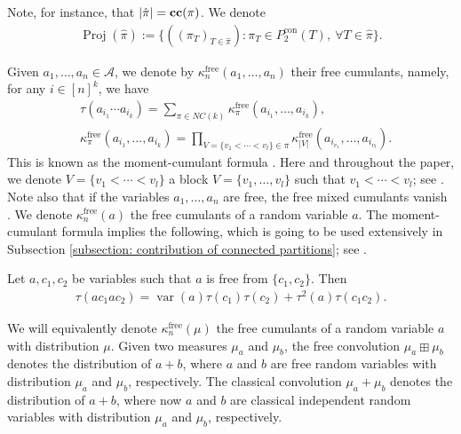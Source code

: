 \documentclass[12pt,reqno]{amsart}
\theoremstyle{plain}
\newcommand{\1}{\mathbf{1}}
\newcommand{\var}{\operatorname{var}}
\newcommand{\A}{\mathcal{A}}
\newcommand{\cumuf}{\kappa^{\operatorname{free}}}
\newcommand{\ccblocks}{\operatorname{\bf cc}}
\newcommand{\proj}{\operatorname{Proj}}
\begin{document}
Note, for instance, that $|\hat{\pi}|=\ccblocks(\pi)$. 
We denote
\begin{align*}
    \proj(\hat{\pi}):=\{((\pi_T)_{T \in \hat{\pi}}): \pi_T \in P_2^{\operatorname{con}}(T), \ \forall T \in \hat{\pi}\}.
\end{align*}

Given $a_1,\ldots,a_n \in \A$, we denote by $\cumuf_n(a_1,\ldots,a_n)$ their free cumulants, namely, for any $i \in [n]^k$, we have
\begin{align*}
    &\tau(a_{i_1}\cdots a_{i_k})=\sum_{\pi \in NC(k)}\cumuf_\pi(a_{i_1},\ldots,a_{i_k}),\\
    &\cumuf_\pi(a_{i_1},\ldots,a_{i_k})=\prod_{V=\{v_1<\cdots<v_l\} \in \pi}\cumuf_{|V|}(a_{i_{v_1}},\ldots,a_{i_{v_l}}).
\end{align*}
This is known as the moment-cumulant formula \cite[Notation 11.5]{nica2006lectures}. Here and throughout the paper, we denote $V=\{v_1<\cdots<v_l\}$ a block $V=\{v_1,\ldots,v_l\}$ such that $v_1< \cdots <v_l$; see  \cite[Lecture 11]{nica2006lectures}.
Note also that if the variables $a_1,\ldots,a_n$ are free, the free mixed cumulants vanish \cite[Proposition 11.15]{nica2006lectures}.
We denote $\cumuf_n(a)$ the free cumulants of a random variable $a$. The moment-cumulant formula implies the following, which is going to be used extensively in Subsection \ref{subsection: contribution of connected partitions}; see \cite[Lecture 5, Equation 5.6]{nica2006lectures}.
\begin{lemma}\label{lemma: contribution of ac1ac2}
    Let $a,c_1,c_2$ be variables such that $a$ is free from $\{c_1,c_2\}$. Then
    \begin{align*}
        \tau(ac_1ac_2)=\var(a)\tau(c_1)\tau(c_2)+\tau^2(a)\tau(c_1c_2).
    \end{align*}
\end{lemma}
We will equivalently denote $\cumuf_n(\mu)$ the free cumulants of a random variable $a$ with distribution $\mu$. Given two measures $\mu_a$ and $\mu_b$, the free convolution $\mu_a \boxplus \mu_b$ denotes the distribution of $a+b$, where $a$ and $b$ are free random variables with distribution $\mu_a$ and $\mu_b$, respectively. The classical convolution $\mu_a+\mu_b$ denotes the distribution of $a+b$, where now $a$ and $b$ are classical independent random variables with distribution $\mu_a$ and $\mu_b$, respectively.


\end{document}
